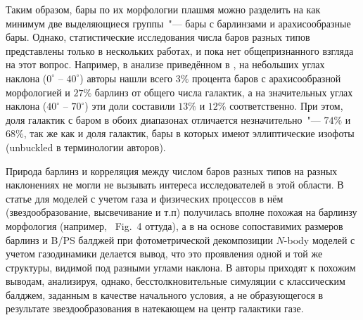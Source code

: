 \documentclass{trlnotes}
\begin{document}
Таким образом, бары по их морфологии плашмя можно разделить на как минимум две выделяющиеся группы~"--- бары с
барлинзами и арахисообразные бары. Однако, статистические исследования числа баров разных типов представлены только в
нескольких работах, и пока нет общепризнанного взгляда на этот вопрос. Например, в анализе приведённом в
\citet{li2017a}, на небольших углах наклона ($0^\circ$ -- $40^\circ$) авторы нашли всего $3\%$ процента баров с
арахисообразной морфологией и $27\%$ барлинз от общего числа галактик, а на значительных углах наклона ($40^\circ$
-- $70^\circ$) эти доли составили $13\%$ и $12\%$ соответственно. При этом, доля галактик с баром в обоих
диапазонах отличается незначительно~"--- $74\%$ и $68\%$, так же как и доля галактик, бары в которых имеют
эллиптические изофоты (unbuckled в терминологии авторов). 

Природа барлинз и корреляция между числом баров разных типов на разных наклонениях не могли не вызывать интереса
исследователей в этой области. В статье \citet{athanassoula2013a} для моделей с учетом газа и физических процессов 
в нём (звездообразование, высвечивание и т.п) получилась вполне похожая на барлинзу морфология (например, ~Fig.~4 
оттуда), а в \citet{athanassoula2015} на основе сопоставимих размеров барлинз и B/PS балджей при фотометрической 
декомпозиции $N$-body моделей с учетом газодинамики делается вывод, что это проявления одной и той же структуры, 
видимой под разными углами наклона. В \cite{salo2017} авторы приходят к похожим выводам, анализируя, 
однако, бесстолкновительные симуляции с классическим балджем, заданным в качестве начального условия, а не 
образующегося в результате звездообразования в натекающем на центр галактики газе. 
\end{document}
